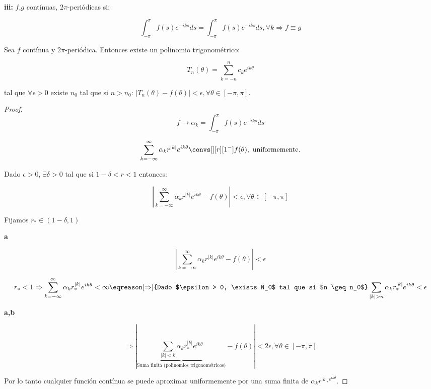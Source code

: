 		\textbf{iii:} $f$,$g$ contínuas, $2\pi$-periódicas si:

		\[ \int_{-\pi}^{\pi} f(s) e^{-iks}ds =
		 \int_{-\pi}^{\pi} f(s) e^{-iks}ds,  \forall k \Rightarrow f \equiv g \]

		\begin{theorem} Sea $f$ contínua y $2\pi$-periódica. Entonces existe un polinomio trigonométrico:

		\[T_n (\theta) = \sum_{k = -n}^n c_k e^{ik\theta} \]

		tal que $\forall \epsilon > 0$ existe $n_0$ tal que si $n > n_0$: $|T_n (\theta) - f(\theta)| < \epsilon, \forall \theta \in [-\pi,\pi]$.
		\end{theorem}

		\begin{proof}

			\[f \rightarrow \alpha_k = \int_{-\pi}^\pi f(s) e^{-iks} ds  \]

			\[ \sum_{k=-\infty}^{\infty} \alpha_k r^{|k|} e^{ik\theta} \convs[][r][1^-] f(\theta), \text{ uniformemente.} \]

			Dado $\epsilon > 0$, $\exists \delta > 0$ tal que si $1-\delta < r < 1$ entonces:

			\[ \left| \sum_{k=-\infty}^{\infty} \alpha_k r^{|k|} e^{ik\theta} - f(\theta) \right| < \epsilon, \forall \theta \in [-\pi,\pi]  \]

			Fijamos $r_{*} \in (1-\delta, 1)$

			\textbf{a}

			\[ \left| \sum_{k=-\infty}^{\infty} \alpha_k r^{|k|} e^{ik\theta} - f(\theta) \right| < \epsilon \]

			\[  r_* < 1 \Rightarrow \sum_{k=-\infty}^\infty \alpha_k r_*^{|k|} e^{ik\theta} < \infty \eqreason[\Rightarrow]{Dado $\epsilon > 0, \exists N_0$ tal que si $n \geq n_0$} \sum_{|k| > n} \alpha_k r_*^{|k|} e^{ik\theta} < \epsilon \]

			\textbf{a,b}

			\[ \Rightarrow  \left| \underbrace{\sum_{|k| < k} \alpha_k r_*^{|k|} e^{ik\theta}}_{\text{Suma finita (polinomios trigonométricos)}} - f(\theta) \right| < 2 \epsilon, \forall \theta \in [-\pi,\pi] \]

			Por lo tanto cualquier función contínua se puede aproximar uniformemente por una suma finita de $\alpha_k r^{|k|_* e^{ik\theta}}$.

		\end{proof}

